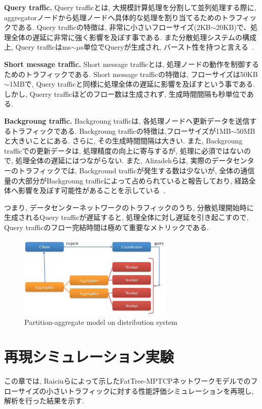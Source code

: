 \documentclass[10pt, a4paper, twocolumn]{jsarticle}
\begin{document}
{\bf Query traffic. }Query trafficとは, 大規模計算処理を分割して並列処理する際に,
aggregatorノードから処理ノードへ具体的な処理を割り当てるためのトラフィックである.
Query trafficの特徴は, 非常に小さいフローサイズ(2KB$\sim$20KB)で、処理全体の遅延に非常に強く影響を及ぼす事である.
また分散処理システムの構成上, Query trafficはms$\sim \mu$s単位でQueryが生成され,
バースト性を持つと言える~\cite{dctcp}.

{\bf Short message traffic. } Short message trafficとは,
処理ノードの動作を制御するためのトラフィックである.
Short message trafficの特徴は, フローサイズは50KB$\sim$1MBで, Query
trafficと同様に処理全体の遅延に影響を及ぼすという事である.
しかし, Querry trafficほどのフロー数は生成されず, 生成時間間隔も秒単位である.

{\bf Backgroung traffic. }Backgroung trafficは,
各処理ノードへ更新データを送信するトラフィックである.
Backgroung trafficの特徴は,フローサイズが1MB$\sim$50MBと大きいことにある.
さらに, その生成時間間隔は大きい.
また, Backgroung trafficでの更新データは, 処理精度の向上に寄与するが, 処理に必須ではないので,
処理全体の遅延にはつながらない.
また, Alizadehらは, 実際のデータセンターのトラフィックでは, Background trafficが発生する数は少ないが,
全体の通信量の大部分がBackgroung trafficによって占められていると報告しており,
経路全体へ影響を及ぼす可能性があることを示している~\cite{traffic}.

つまり, データセンターネットワークのトラフィックのうち, 分散処理開始時に生成されるQuery trafficが遅延すると,
処理全体に対し遅延を引き起こすので, Query trafficのフロー完結時間は極めて重要なメトリックである.

\begin{figure}[h]
    \begin{center}
    \includegraphics[autoebb, width=210pt]{./img/part_aggr.pdf}
    \caption{Partition-aggregate model on distribution system}
    \label{fig:part_aggr}
    \end{center}
\end{figure}

\section{再現シミュレーション実験}
\label{sec:reproduction}
この章では,
Raiciuらによって示したFatTree-MPTCPネットワークモデルでのフローサイズの小さいトラフィックに対する性能評価シミュレーションを再現し,
解析を行った結果を示す.
\end{document}

